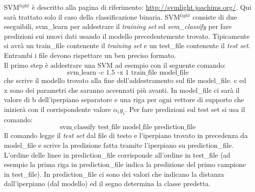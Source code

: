 SVM$^{light}$ è descritto alla pagina di riferimento: \href{http://svmlight.joachims.org/}{http://svmlight.joachims.org/}. Qui sarà trattato solo il caso della classificazione binaria. SVM$^{light}$ consiste di due eseguibili, svm\_learn per addestrare il \textit{training set} ed \textit{svm\_classify} per fare predizioni sui nuovi dati usando il modello precedentemente  trovato. Tipicamente si avrà un train\_file contenente il \textit{training set} e un test\_file contenente il \textit{test set}. Entrambi i file devono rispettare un ben preciso formato. \\Il primo step è addestrare una \ac{SVM} ad esempio con il seguente comando:
\begin{equation*}
\text{svm\_learn -c 1.5  -x 1  train\_file  model\_file}
\end{equation*}
che scrive il modello trovato alla fine dell'addestramento sul file model\_file. c ed x sono dei parametri che saranno accennati più avanti. In model\_file ci sarà il valore di b dell'iperpiano separatore e una riga per ogni vettore di supporto che inizierà con il corrispondente valore $\alpha_iy_i$. Per fare predizioni sul test set si usa il comando:
\begin{equation*}
\text{svm\_classify test\_file model\_file prediction\_file}
\end{equation*}
Il comando legge il \textit{test set} dal file di testo e l'iperpiano trovato in precedenza da model\_file e scrive la predizione fatta tramite l'iperpiano su prediction\_file. L'ordine delle linee in prediction\_file corrisponde all'ordine in test\_file (ad esempio la prima riga in prediction\_file indica la predizione del primo campione in test\_file). In prediction\_file ci sono dei valori che indicano la distanza dall'iperpiano (dal modello) ed il segno determina la classe predetta.

